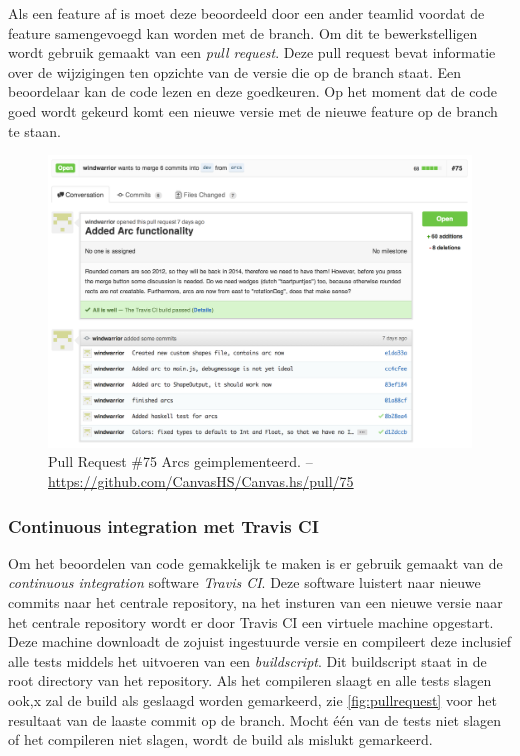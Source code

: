 Als een feature af is moet deze beoordeeld door een ander teamlid voordat de feature samengevoegd kan worden met de  branch. Om dit te bewerkstelligen wordt gebruik gemaakt van een \emph{pull request}. Deze pull request bevat informatie over de wijzigingen ten opzichte van de versie die op de  branch staat. Een beoordelaar kan de code lezen en deze goedkeuren. Op het moment dat de code goed wordt gekeurd komt een nieuwe versie met de nieuwe feature op de  branch te staan.

\begin{figure}
\begin{center}
\includegraphics[keepaspectratio,width=\textwidth]{./images/pullrequest.png}
\caption{Pull Request \#75 Arcs geimplementeerd. – \url{https://github.com/CanvasHS/Canvas.hs/pull/75}}
\label{fig:pullrequest}
\end{center}
\end{figure}

\subsubsection{Continuous integration met Travis CI}
Om het beoordelen van code gemakkelijk te maken is er gebruik gemaakt van de \emph{continuous integration} software \emph{Travis CI}. Deze software luistert naar nieuwe commits naar het centrale repository, na het insturen van een nieuwe versie naar het centrale repository wordt er door Travis CI een virtuele machine opgestart. Deze machine downloadt de zojuist ingestuurde versie en compileert deze inclusief alle tests middels het uitvoeren van een \emph{buildscript}. Dit buildscript staat in de root directory van het repository. Als het compileren slaagt en alle tests slagen ook,x zal de build als geslaagd worden gemarkeerd, zie \autoref{fig:pullrequest} voor het resultaat van de laaste commit op de  branch. Mocht één van de tests niet slagen of het compileren niet slagen, wordt de build als mislukt gemarkeerd.

